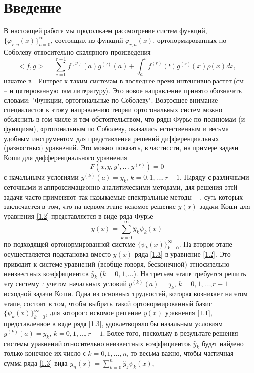 \section{Введение}
В настоящей работе мы продолжаем  рассмотрение систем функций,
$\{ \varphi_{r,n}(x)\}_{n=0}^\infty$, состоящих из функций $\varphi_{r,n}(x)$, ортонормированных по Соболеву относительно скалярного произведения
\begin{equation}\label{1.1}
<f,g>=\sum_{\nu=0}^{r-1}f^{(\nu)}(a)g^{(\nu)}(a)+\int_{a}^{b}f^{(r)}(t)g^{(r)}(x)\rho(x)dx,
\end{equation}
начатое в \cite{Shar20}.   Интерес к таким системам  в последнее время интенсивно растет  (см. \cite{Shar2016} -- \cite{Shar13}  и цитированную там литературу). Это новое направление принято обозначать словами: "Функции, ортогональные по Соболеву". Возросшее  внимание специалистов  к этому направлению теории ортогональных систем можно объяснить в том числе и тем обстоятельством, что ряды Фурье по полиномам (и функциям), ортогональным по Соболеву, оказались естественным и весьма удобным инструментом для представления решений  дифференциальных (разностных) уравнений. Это можно показать, в частности, на примере  задачи Коши для  дифференциального уравнения
\begin{equation}\label{1.2}
F(x,y,y',\ldots,y^{(r)})=0
 \end{equation}
с начальными условиями $y^{(k)}(a)=y_k$, $k=0,1,\ldots,r-1$.  Наряду с различными сеточными и аппроксимационно-аналитическими методами, для решения этой задачи часто применяют так называемые спектральные методы \cite{Tref1} -- \cite{Shar18}, суть которых  заключается в том, что на первом этапе искомое решение $y(x)$ задачи Коши для уравнения \eqref{1.2} представляется в виде ряда Фурье
\begin{equation}\label{1.3}
 y(x)=\sum_{k=0}^\infty \hat y_k\psi_k(x)
 \end{equation}
по подходящей ортонормированной системе $\{\psi_k(x)\}_{k=0}^\infty$. На втором этапе осуществляется подстановка вместо $y(x)$ ряда \eqref{1.3} в уравнение \eqref{1.2}. Это приводит к системе уравнений (вообще говоря, бесконечной) относительно неизвестных коэффициентов $\hat y_k$ ($k=0,1,\ldots$). На третьем этапе требуется решить эту систему с учетом начальных условий  $y^{(k)}(a)=y_k$, $k=0,1,\ldots,r-1$ исходной задачи Коши.
Одна из основных трудностей, которая возникает на этом этапе, состоит в том, чтобы
выбрать такой ортонормированный базис $\{\psi_k(x)\}_{k=0}^\infty$, для которого искомое решение $y(x)$ уравнения \eqref{1.1}, представленное в виде ряда  \eqref{1.3}, удовлетворяло бы начальным условиям $y^{(k)}(a)=y_k$, $k=0,1,\ldots,r-1$. Более того, поскольку в результате решения системы уравнений относительно неизвестных коэффициентов $\hat y_k$  будет найдено только конечное их число с $k=0,1,\ldots, n$, то весьма важно, чтобы частичная сумма ряда \eqref{1.3} вида $ y_n(x)=\sum_{k=0}^n\hat y_k\psi_k(x)$,
